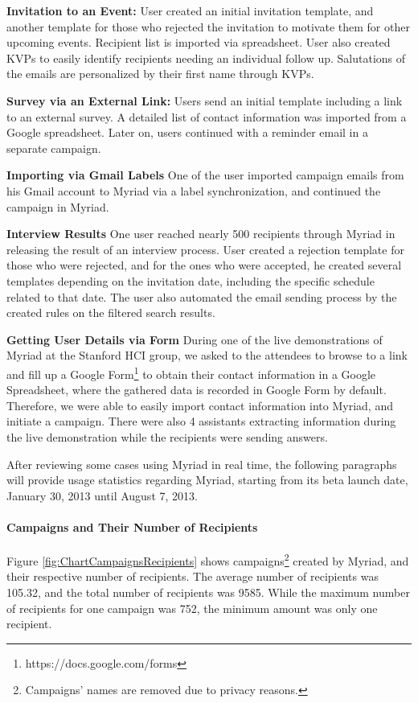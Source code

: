 \begin{compactitem}
	\item \textbf{Invitation to an Event:} User created an initial invitation template, and another template for those who rejected the invitation to motivate them for other upcoming events. Recipient list is imported via spreadsheet. User also created \ac{KVP}s to easily identify recipients needing an individual follow up. Salutations of the emails are personalized by their first name through \ac{KVP}s.
	\item \textbf{Survey via an External Link:} Users send an initial template including a link to an external survey. A detailed list of contact information was imported from a Google spreadsheet. Later on, users continued with a reminder email in a separate campaign.
	\item \textbf{Importing via Gmail Labels} One of the user imported campaign emails from his Gmail account to Myriad via a label synchronization, and continued the campaign in Myriad.
	\item \textbf{Interview Results} One user reached nearly 500 recipients through Myriad in releasing the result of an interview process. User created a rejection template for those who were rejected, and for the ones who were accepted, he created several templates depending on the invitation date, including the specific schedule related to that date. The user also automated the email sending process by the created rules on the filtered search results.
	\item \textbf{Getting User Details via Form} During one of the live demonstrations of Myriad at the Stanford \ac{HCI} group, we asked to the attendees to browse to a link and fill up a Google Form\footnote{https://docs.google.com/forms} to obtain their contact information in a Google Spreadsheet, where the gathered data is recorded in Google Form by default. Therefore, we were able to easily import contact information into Myriad, and initiate a campaign. There were also 4 assistants extracting information during the live demonstration while the recipients were sending answers.
\end{compactitem}
\vspace{1cm}

After reviewing some cases using Myriad in real time, the following paragraphs will provide usage statistics regarding Myriad, starting from its beta launch date, January 30, 2013 until August 7, 2013.

\paragraph{Campaigns and Their Number of Recipients} Figure \ref{fig:ChartCampaignsRecipients} shows campaigns\footnote{Campaigns' names are removed due to privacy reasons.} created by Myriad, and their respective number of recipients. The average number of recipients was 105.32, and the total number of recipients was 9585. While the maximum number of recipients for one campaign was 752, the minimum amount was only one recipient.

